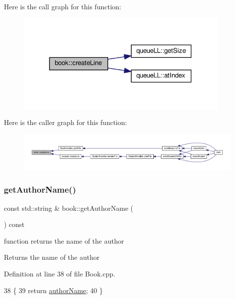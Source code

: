 Here is the call graph for this function\+:
\nopagebreak
\begin{figure}[H]
\begin{center}
\leavevmode
\includegraphics[width=297pt]{classbook_aea835c54459ec0a4d29d42f2f6f7858d_cgraph}
\end{center}
\end{figure}
Here is the caller graph for this function\+:
\nopagebreak
\begin{figure}[H]
\begin{center}
\leavevmode
\includegraphics[width=350pt]{classbook_aea835c54459ec0a4d29d42f2f6f7858d_icgraph}
\end{center}
\end{figure}
\mbox{\label{classbook_a8cfa3bc064dafb1fde6bd997d0075df9}} 
\subsubsection{\texorpdfstring{get\+Author\+Name()}{getAuthorName()}}
{\footnotesize\ttfamily const std\+::string \& book\+::get\+Author\+Name (\begin{DoxyParamCaption}{ }\end{DoxyParamCaption}) const}

function returns the name of the author \begin{DoxyReturn}{Returns}
the name of the author 
\end{DoxyReturn}


Definition at line 38 of file Book.\+cpp.


\begin{DoxyCode}
38                                            \{
39     \textcolor{keywordflow}{return} \hyperlink{classbook_a21b2962c6227818732db27f12121b732}{authorName};
40 \}
\end{DoxyCode}
\mbox{\label{classbook_a51aa01018a7c1569388aac015578e057}} 

